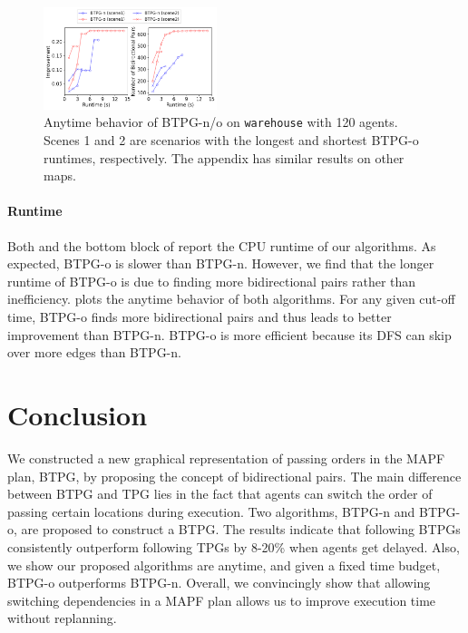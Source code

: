 \documentclass[letterpaper]{article} %
\theoremstyle{definition}
\begin{document}
\begin{figure}[t!]
    \centering
    \includegraphics[width=0.45\textwidth]{Figs/anytime_warehouse.png}
    \caption{Anytime behavior of BTPG-n/o on \texttt{warehouse} with 120 agents. Scenes 1 and 2 are scenarios with the longest and shortest BTPG-o runtimes, respectively. The appendix has similar results on other maps.}
    \label{fig:anytime}
\end{figure}

\paragraph{Runtime}
Both  and the bottom block of  report the CPU runtime of our algorithms. As expected, BTPG-o is slower than BTPG-n. %
However, we find that the longer runtime of BTPG-o is due to finding more bidirectional pairs rather than inefficiency.  plots the anytime behavior of both algorithms. For any given cut-off time, BTPG-o finds more bidirectional pairs and thus leads to better improvement than BTPG-n. BTPG-o is more efficient because its DFS can skip over more edges than BTPG-n.




\section{Conclusion}
We constructed a new graphical representation of passing orders in the MAPF plan, BTPG, by proposing the concept of bidirectional pairs. The main difference between BTPG and TPG lies in the fact that agents can switch the order of passing certain locations during execution. Two algorithms, BTPG-n and BTPG-o, are proposed to construct a BTPG. The results indicate that following BTPGs consistently outperform following TPGs by 8-20\% when agents get delayed. Also, we show our proposed algorithms are anytime, and given a fixed time budget, BTPG-o outperforms BTPG-n. Overall, we convincingly show that allowing switching dependencies in a MAPF plan allows us to improve execution time without replanning.
\end{document}
